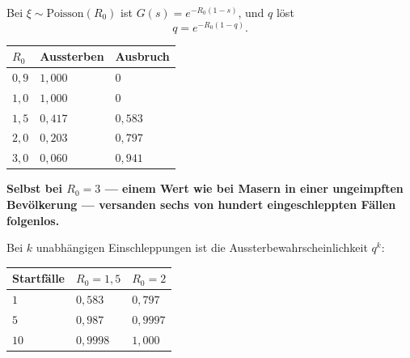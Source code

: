 \begin{merksatz}
Bei $\xi \sim \text{Poisson}(R_0)$ ist $G(s) = e^{-R_0(1-s)}$, und $q$ löst
\[ q = e^{-R_0(1-q)} . \]

\begin{center}
{\small
\renewcommand{\arraystretch}{1.48}
\begin{tabular}{@{}P{1.8cm}P{2.4cm}P{2.6cm}@{}}
\toprule
$R_0$ & \textbf{Aussterben} & \textbf{Ausbruch}\\
\midrule
$0{,}9$ & $1{,}000$ & $0$\\
$1{,}0$ & $1{,}000$ & $0$\\
$1{,}5$ & $0{,}417$ & $0{,}583$\\
$2{,}0$ & $0{,}203$ & $0{,}797$\\
$3{,}0$ & $0{,}060$ & $0{,}941$\\
\bottomrule
\end{tabular}}
\end{center}

\begin{center}
\begin{minipage}{0.9\textwidth}
\textbf{Selbst bei $R_0 = 3$ --- einem Wert wie bei Masern in einer ungeimpften Bevölkerung --- versanden sechs von hundert eingeschleppten Fällen folgenlos.}
\end{minipage}
\end{center}

Bei $k$ unabhängigen Einschleppungen ist die Aussterbewahrscheinlichkeit $q^{k}$:

\begin{center}
{\small
\renewcommand{\arraystretch}{1.48}
\begin{tabular}{@{}P{2.0cm}P{2.2cm}P{2.2cm}@{}}
\toprule
\textbf{Startfälle} & $R_0 = 1{,}5$ & $R_0 = 2$\\
\midrule
$1$ & $0{,}583$ & $0{,}797$\\
$5$ & $0{,}987$ & $0{,}9997$\\
$10$ & $0{,}9998$ & $1{,}000$\\
\bottomrule
\end{tabular}}
\end{center}

\begin{center}
\begin{minipage}{0.88\textwidth}
\end{minipage}
\end{center}
\end{merksatz}

